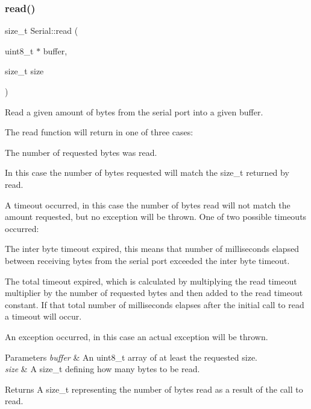 \subsubsection{\texorpdfstring{read()}{read()}\hspace{0.1cm}{\footnotesize\ttfamily [1/4]}}
{\footnotesize\ttfamily size\+\_\+t Serial\+::read (\begin{DoxyParamCaption}\item[{uint8\+\_\+t $\ast$}]{buffer,  }\item[{size\+\_\+t}]{size }\end{DoxyParamCaption})}

Read a given amount of bytes from the serial port into a given buffer.

The read function will return in one of three cases\+:
\begin{DoxyItemize}
\item The number of requested bytes was read.
\begin{DoxyItemize}
\item In this case the number of bytes requested will match the size\+\_\+t returned by read.
\end{DoxyItemize}
\item A timeout occurred, in this case the number of bytes read will not match the amount requested, but no exception will be thrown. One of two possible timeouts occurred\+:
\begin{DoxyItemize}
\item The inter byte timeout expired, this means that number of milliseconds elapsed between receiving bytes from the serial port exceeded the inter byte timeout.
\item The total timeout expired, which is calculated by multiplying the read timeout multiplier by the number of requested bytes and then added to the read timeout constant. If that total number of milliseconds elapses after the initial call to read a timeout will occur.
\end{DoxyItemize}
\item An exception occurred, in this case an actual exception will be thrown.
\end{DoxyItemize}


\begin{DoxyParams}{Parameters}
{\em buffer} & An uint8\+\_\+t array of at least the requested size. \\
\hline
{\em size} & A size\+\_\+t defining how many bytes to be read.\\
\hline
\end{DoxyParams}
\begin{DoxyReturn}{Returns}
A size\+\_\+t representing the number of bytes read as a result of the call to read.
\end{DoxyReturn}


